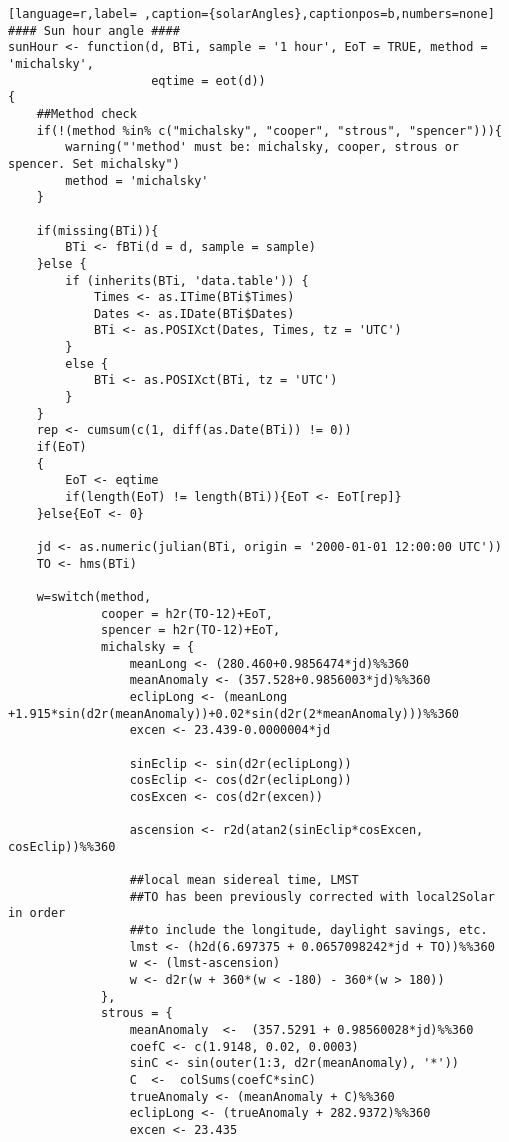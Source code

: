 \begin{lstlisting}[language=r,label= ,caption={solarAngles},captionpos=b,numbers=none]
#### Sun hour angle ####
sunHour <- function(d, BTi, sample = '1 hour', EoT = TRUE, method = 'michalsky',
                    eqtime = eot(d))
{
    ##Method check
    if(!(method %in% c("michalsky", "cooper", "strous", "spencer"))){
        warning("'method' must be: michalsky, cooper, strous or spencer. Set michalsky")
        method = 'michalsky'
    }

    if(missing(BTi)){
        BTi <- fBTi(d = d, sample = sample)
    }else {
        if (inherits(BTi, 'data.table')) {
            Times <- as.ITime(BTi$Times)
            Dates <- as.IDate(BTi$Dates)
            BTi <- as.POSIXct(Dates, Times, tz = 'UTC')
        }
        else {
            BTi <- as.POSIXct(BTi, tz = 'UTC')
        }   
    }
    rep <- cumsum(c(1, diff(as.Date(BTi)) != 0))
    if(EoT)
    {
        EoT <- eqtime
        if(length(EoT) != length(BTi)){EoT <- EoT[rep]}
    }else{EoT <- 0}

    jd <- as.numeric(julian(BTi, origin = '2000-01-01 12:00:00 UTC'))
    TO <- hms(BTi)

    w=switch(method,
             cooper = h2r(TO-12)+EoT,
             spencer = h2r(TO-12)+EoT,
             michalsky = {
                 meanLong <- (280.460+0.9856474*jd)%%360
                 meanAnomaly <- (357.528+0.9856003*jd)%%360
                 eclipLong <- (meanLong +1.915*sin(d2r(meanAnomaly))+0.02*sin(d2r(2*meanAnomaly)))%%360
                 excen <- 23.439-0.0000004*jd

                 sinEclip <- sin(d2r(eclipLong))
                 cosEclip <- cos(d2r(eclipLong))
                 cosExcen <- cos(d2r(excen))

                 ascension <- r2d(atan2(sinEclip*cosExcen, cosEclip))%%360

                 ##local mean sidereal time, LMST
                 ##TO has been previously corrected with local2Solar in order
                 ##to include the longitude, daylight savings, etc.
                 lmst <- (h2d(6.697375 + 0.0657098242*jd + TO))%%360
                 w <- (lmst-ascension)
                 w <- d2r(w + 360*(w < -180) - 360*(w > 180))
             },
             strous = {
                 meanAnomaly  <-  (357.5291 + 0.98560028*jd)%%360
                 coefC <- c(1.9148, 0.02, 0.0003)
                 sinC <- sin(outer(1:3, d2r(meanAnomaly), '*'))
                 C  <-  colSums(coefC*sinC)
                 trueAnomaly <- (meanAnomaly + C)%%360
                 eclipLong <- (trueAnomaly + 282.9372)%%360
                 excen <- 23.435


\end{lstlisting}
